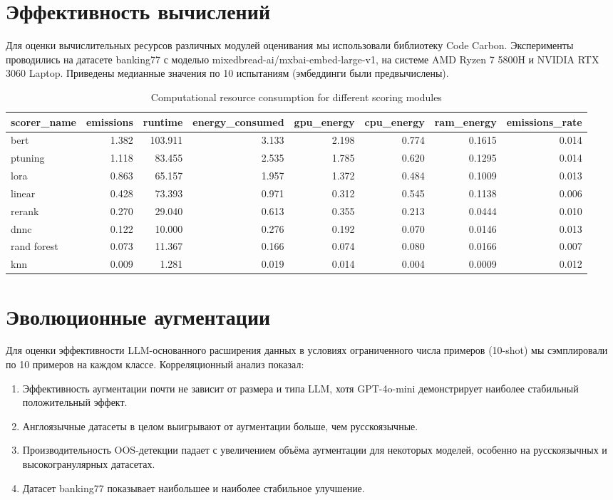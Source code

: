 \documentclass[14pt,a4paper,oneside,openany]{extbook}
\begin{document}
\section{Эффективность вычислений}
\label{sec:org69c4bca}

Для оценки вычислительных ресурсов различных модулей оценивания мы использовали библиотеку Code Carbon. Эксперименты проводились на датасете banking77 с моделью mixedbread-ai/mxbai-embed-large-v1, на системе AMD Ryzen 7 5800H и NVIDIA RTX 3060 Laptop. Приведены медианные значения по 10 испытаниям (эмбеддинги были предвычислены).

\begin{table}[htbp]
\caption{\label{tab:computational}Computational resource consumption for different scoring modules}
\centering
\begin{tabular}{lrrrrrrr}
scorer\_name & emissions & runtime & energy\_consumed & gpu\_energy & cpu\_energy & ram\_energy & emissions\_rate\\
\hline
bert & 1.382 & 103.911 & 3.133 & 2.198 & 0.774 & 0.1615 & 0.014\\
ptuning & 1.118 & 83.455 & 2.535 & 1.785 & 0.620 & 0.1295 & 0.014\\
lora & 0.863 & 65.157 & 1.957 & 1.372 & 0.484 & 0.1009 & 0.013\\
linear & 0.428 & 73.393 & 0.971 & 0.312 & 0.545 & 0.1138 & 0.006\\
rerank & 0.270 & 29.040 & 0.613 & 0.355 & 0.213 & 0.0444 & 0.010\\
dnnc & 0.122 & 10.000 & 0.276 & 0.192 & 0.070 & 0.0146 & 0.013\\
rand forest & 0.073 & 11.367 & 0.166 & 0.074 & 0.080 & 0.0166 & 0.007\\
knn & 0.009 & 1.281 & 0.019 & 0.014 & 0.004 & 0.0009 & 0.012\\
\end{tabular}
\end{table}
\section{Эволюционные аугментации}
\label{sec:org13bd004}

Для оценки эффективности LLM-основанного расширения данных в условиях ограниченного числа примеров (10-shot) мы сэмплировали по 10 примеров на каждом классе. Корреляционный анализ показал:

\begin{enumerate}
\item Эффективность аугментации почти не зависит от размера и типа LLM, хотя GPT-4o-mini демонстрирует наиболее стабильный положительный эффект.
\item Англоязычные датасеты в целом выигрывают от аугментации больше, чем русскоязычные.
\item Производительность OOS-детекции падает с увеличением объёма аугментации для некоторых моделей, особенно на русскоязычных и высокогранулярных датасетах.
\item Датасет banking77 показывает наибольшее и наиболее стабильное улучшение.
\end{enumerate}
\end{document}

